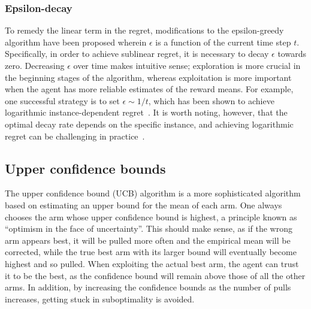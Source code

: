 \subsubsection{Epsilon-decay}
To remedy the linear term in the regret, modifications to the epsilon-greedy algorithm have been proposed wherein $\epsilon$ is a function of the current time step $t$.
Specifically, in order to achieve sublinear regret, it is necessary to decay $\epsilon$ towards zero.
Decreasing $\epsilon$ over time makes intuitive sense; exploration is more crucial in the beginning stages of the algorithm, whereas exploitation is more important when the agent has more reliable estimates of the reward means.
For example, one successful strategy is to set $\epsilon \sim 1/t$, which has been shown to achieve logarithmic instance-dependent regret~\autocite{auer2002}.
It is worth noting, however, that the optimal decay rate depends on the specific instance, and achieving logarithmic regret can be challenging in practice~\autocite{bubeck2012}.


\subsection{Upper confidence bounds}
The upper confidence bound (UCB) algorithm is a more sophisticated algorithm based on estimating an upper bound for the mean of each arm.
One always chooses the arm whose upper confidence bound is highest, a principle known as \enquote{optimism in the face of uncertainty}.
This should make sense, as if the wrong arm appears best, it will be pulled more often and the empirical mean will be corrected, while the true best arm with its larger bound will eventually become highest and so pulled.
When exploiting the actual best arm, the agent can trust it to be the best, as the confidence bound will remain above those of all the other arms.
In addition, by increasing the confidence bounds as the number of pulls increases, getting stuck in suboptimality is avoided.

